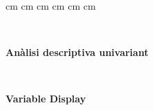 \pagestyle{plain}
 cm
 cm
 cm
 cm
 cm
 cm

\setlength{\baselineskip}{1.5em}
\setlength{\parskip}{0em}
\setlength{\parsep}{0.5em}
\newcommand{\lge}[1]{\hbox{#1\kern-.1em\raise.5ex\hbox{.}\kern-.1em #1}}
\mbox{ } \vfill
\begin{center} \Large \bf An\`alisi descriptiva univariant \end{center} \vfill

\vspace{3ex}
\mbox{ } \vfill
\begin{center} \Large \bf Variable Display \end{center}

